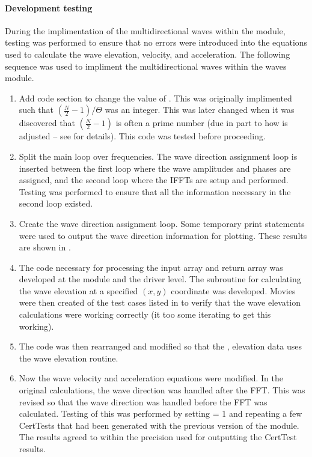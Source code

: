 \paragraph*{Development testing}
During the implimentation of the multidirectional waves within the  module, testing was performed to ensure that no errors were introduced into the equations used to calculate the wave elevation, velocity, and acceleration.  The following sequence was used to impliment the multidirectional waves within the waves module.
\begin{enumerate}
   \item{Add code section to change the value of .  This was originally implimented such that $(\frac{N}{2}-1)/\Theta$ was an integer.  This was later changed when it was discovered that $(\frac{N}{2}-1)$ is often a prime number (due in part to how  is adjusted -- see  for details). This code was tested before proceeding.}
   \item{Split the main loop over  frequencies.  The wave direction assignment loop is inserted between the first loop where the wave amplitudes and phases are assigned, and the second loop where the IFFTs are setup and performed.  Testing was performed to ensure that all the information necessary in the second loop existed.}
   \item{Create the wave direction assignment loop.  Some temporary print statements were used to output the wave direction information for plotting.  These results are shown in .}
   \item{The code necessary for processing the input array  and return array  was developed at the  module and the  driver level.  The subroutine for calculating the wave elevation at a specified $(x,y)$ coordinate was developed.  Movies were then created of the test cases listed in  to verify that the wave elevation calculations were working correctly (it too some iterating to get this working).}
   \item{The code was then rearranged and modified so that the ,  elevation data uses the wave elevation routine.}
   \item{Now the wave velocity and acceleration equations were modified.  In the original calculations, the wave direction was handled after the FFT.  This was revised so that the wave direction was handled before the FFT was calculated.  Testing of this was performed by setting  = 1 and repeating a few CertTests that had been generated with the previous version of the  module.  The results agreed to within the precision used for outputting the CertTest results.}
\end{enumerate}


